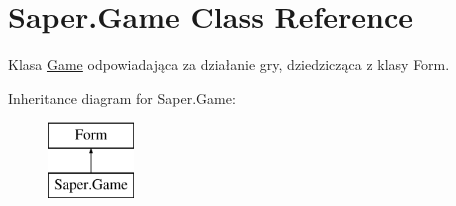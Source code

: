 \hypertarget{class_saper_1_1_game}{}\section{Saper.\+Game Class Reference}
\label{class_saper_1_1_game}


Klasa \mbox{\hyperlink{class_saper_1_1_game}{Game}} odpowiadająca za działanie gry, dziedzicząca z klasy Form.  


Inheritance diagram for Saper.\+Game\+:\begin{figure}[H]
\begin{center}
\leavevmode
\includegraphics[height=2.000000cm]{class_saper_1_1_game}
\end{center}
\end{figure}
